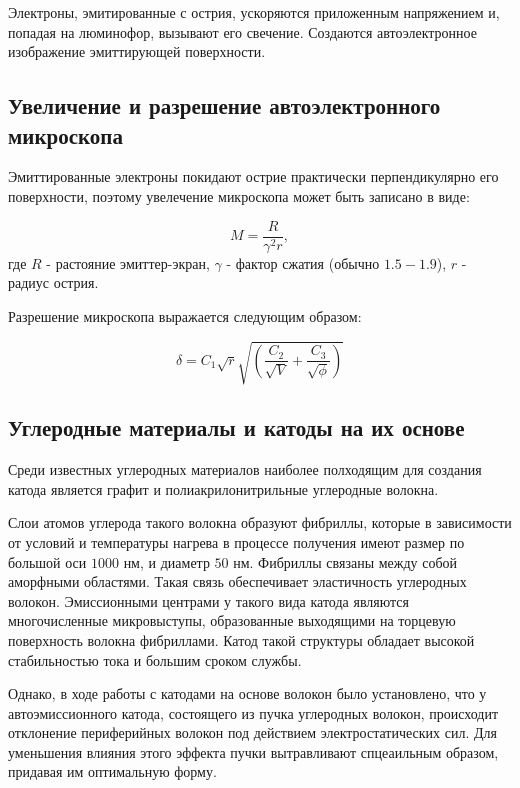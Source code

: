 \documentclass[12pt,a4paper]{article}
\begin{document}
Электроны, эмитированные с острия, ускоряются приложенным напряжением и, попадая на люминофор, вызывают его свечение. Создаются автоэлектронное изображение эмиттирующей поверхности.

\subsection{Увеличение и разрешение автоэлектронного микроскопа} %
\label{sub:увелечение_и_разрешение_автоэлектронного_микроскопа}

Эмиттированные электроны покидают острие практически перпендикулярно его поверхности, поэтому увелечение микроскопа может быть записано в виде:

\begin{equation*}
	M = \frac{R}{\gamma^2 r},
\end{equation*}
где $R$ - растояние эмиттер-экран, $\gamma$ - фактор сжатия (обычно $1.5-1.9$), $r$ - радиус острия.

Разрешение микроскопа выражается следующим образом:

\begin{equation*}
\delta = C_1 \sqrt{r} \sqrt{(\frac{C_2}{\sqrt{V}}+ \frac{C_3}{\sqrt{\phi}})}
\end{equation*}


\subsection{Углеродные материалы и катоды на их основе} %
\label{sub:углеродные_материалы_и_катоды_на_их_основе}

Среди известных углеродных материалов наиболее полходящим для создания катода является графит и полиакрилонитрильные углеродные волокна. 

Слои атомов углерода такого волокна образуют фибриллы, которые в зависимости от условий и температуры нагрева в процессе получения имеют размер по большой оси $1000$ нм, и диаметр $50$ нм. Фибриллы связаны между собой аморфными областями. Такая связь обеспечивает эластичность углеродных волокон. Эмиссионными центрами у такого вида катода являются многочисленные микровыступы, образованные выходящими на торцевую поверхность волокна фибриллами. Катод такой структуры обладает высокой стабильностью тока и большим сроком службы.

Однако, в ходе работы с катодами на основе волокон было установлено, что у автоэмиссионного катода, состоящего из пучка углеродных волокон, происходит отклонение периферийных волокон под действием электростатических сил. Для уменьшения влияния этого эффекта пучки вытравливают спцеаильным образом, придавая им оптимальную форму.
\end{document}
